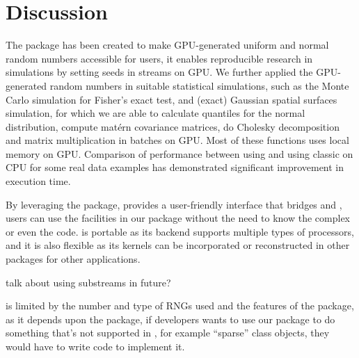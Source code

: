 \documentclass[article,nojss]{jss}\usepackage[]{graphicx}\usepackage[]{color}
\begin{document}
\section{Discussion}
The package  has been created to make GPU-generated uniform and normal random numbers accessible for  users, it enables reproducible research in simulations by setting seeds in streams on GPU. We further applied the GPU-generated random numbers in suitable statistical simulations, such as the Monte Carlo simulation for Fisher’s exact test, and (exact) Gaussian spatial surfaces simulation, for which we are able to calculate quantiles for the normal distribution, compute mat\'ern covariance matrices, do Cholesky decomposition and matrix multiplication in batches on GPU. Most of these functions uses local memory on GPU. Comparison of performance between using  and using classic  on CPU for some real data examples has demonstrated significant improvement in execution time. 

By leveraging the  package,  provides a user-friendly interface that bridges  and , users can use the facilities in our package without the need to know the complex  or even the  code.   is portable as its backend  supports multiple types of processors, and it is also flexible as its kernels can be incorporated or reconstructed in other  packages for other applications. 


talk about using substreams in future?




 is limited by the number and type of  RNGs used and the features of the  package, as it depends upon the  package, if developers wants to use our package to do something that's not supported in , for example ``sparse'' class objects, they would have to write  code to implement it.
\end{document}
